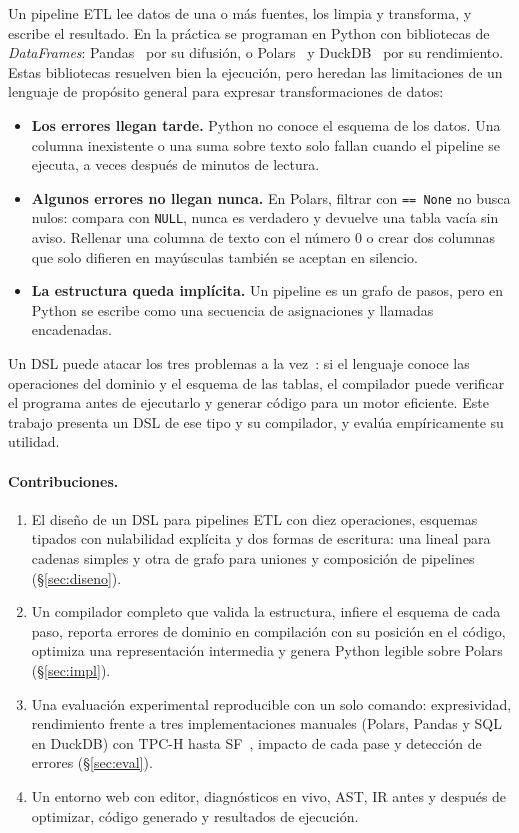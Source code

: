 \documentclass[sigplan,screen,nonacm]{acmart}
\begin{document}
Un pipeline ETL lee datos de una o más fuentes, los limpia y transforma, y escribe el
resultado. En la práctica se programan en Python con bibliotecas de \emph{DataFrames}:
Pandas~\cite{mckinney2010} por su difusión, o Polars~\cite{polars} y DuckDB~\cite{raasveldt2019}
por su rendimiento. Estas bibliotecas resuelven bien la ejecución, pero heredan las
limitaciones de un lenguaje de propósito general para expresar transformaciones de datos:

\begin{itemize}
  \item \textbf{Los errores llegan tarde.} Python no conoce el esquema de los datos. Una
    columna inexistente o una suma sobre texto solo fallan cuando el pipeline se ejecuta,
    a veces después de minutos de lectura.
  \item \textbf{Algunos errores no llegan nunca.} En Polars, filtrar con
    \texttt{== None} no busca nulos: compara con \texttt{NULL}, nunca es verdadero y
    devuelve una tabla vacía sin aviso. Rellenar una columna de texto con el número 0 o crear dos
    columnas que solo difieren en mayúsculas también se aceptan en silencio.
  \item \textbf{La estructura queda implícita.} Un pipeline es un grafo de pasos, pero en
    Python se escribe como una secuencia de asignaciones y llamadas encadenadas.
\end{itemize}

Un DSL puede atacar los tres problemas a la vez~\cite{mernik2005,vandeursen2000}: si el
lenguaje conoce las operaciones del dominio y el esquema de las tablas, el compilador puede
verificar el programa antes de ejecutarlo y generar código para un motor eficiente. Este
trabajo presenta un DSL de ese tipo y su compilador, y evalúa empíricamente su utilidad.

\paragraph{Contribuciones.}
\begin{enumerate}
  \item El diseño de un DSL para pipelines ETL con diez operaciones, esquemas tipados con
    nulabilidad explícita y dos formas de escritura: una lineal para cadenas simples y otra
    de grafo para uniones y composición de pipelines (\S\ref{sec:diseno}).
  \item Un compilador completo que valida la estructura, infiere el esquema de cada paso,
    reporta errores de dominio en compilación con su posición en el código, optimiza una
    representación intermedia y genera Python legible sobre Polars (\S\ref{sec:impl}).
  \item Una evaluación experimental reproducible con un solo comando: expresividad,
    rendimiento frente a tres implementaciones manuales (Polars, Pandas y SQL en DuckDB)
    con TPC-H hasta SF~\SFmax{}, impacto de cada pase y detección de errores
    (\S\ref{sec:eval}).
  \item Un entorno web con editor, diagnósticos en vivo, AST, IR antes y después de
    optimizar, código generado y resultados de ejecución.
\end{enumerate}
\end{document}
